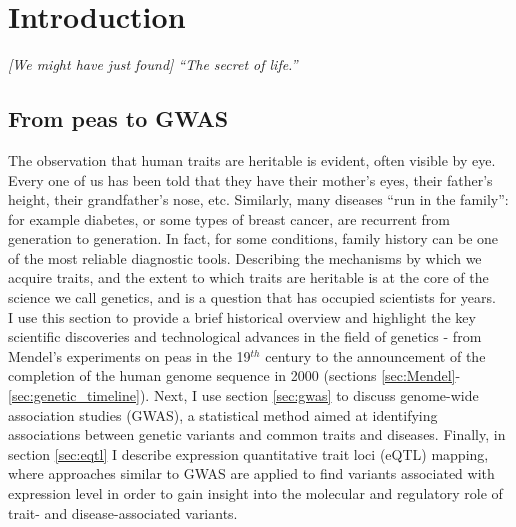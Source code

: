 
\chapter{Introduction}  %

\textit{[We might have just found] “The secret of life.”}\\

\section{From peas to GWAS}  %

The observation that human traits are heritable is evident, often visible by eye. 
Every one of us has been told that they have their mother’s eyes, their father’s height, their grandfather’s nose, etc. 
Similarly, many diseases “run in the family”: for example diabetes, or some types of breast cancer, are recurrent from generation to generation. 
In fact, for some conditions, family history can be one of the most reliable diagnostic tools. 
Describing the mechanisms by which we acquire traits, and the extent to which traits are heritable is at the core of the science we call genetics, and is a question that has occupied scientists for years.\\

I use this section to provide a brief historical overview and highlight the key scientific discoveries and technological advances in the field of genetics - from Mendel's experiments on peas in the 19$^{th}$ century to the announcement of the completion of the human genome sequence in 2000 (sections \ref{sec:Mendel}-\ref{sec:genetic_timeline}).
Next, I use section \ref{sec:gwas} to discuss genome-wide association studies (GWAS), a statistical method aimed at identifying associations between genetic variants and common traits and diseases.
Finally, in section \ref{sec:eqtl} I describe expression quantitative trait loci (eQTL) mapping, where approaches similar to GWAS are applied to find variants associated with expression level in order to gain insight into the molecular and regulatory role of trait- and disease-associated variants.

